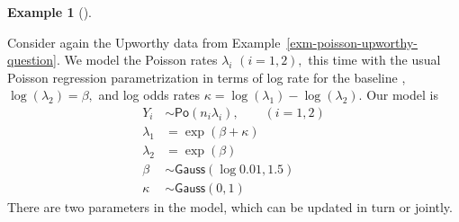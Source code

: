 \documentclass[
  11pt,
  letterpaper,
]{scrbook}
\theoremstyle{definition}
\newtheorem{example}{Example}[chapter]
\theoremstyle{plain}
\theoremstyle{plain}
\theoremstyle{plain}
\theoremstyle{definition}
\theoremstyle{definition}
\theoremstyle{plain}
\theoremstyle{plain}
\theoremstyle{remark}
\begin{document}
\begin{example}[]\protect\hypertarget{exm-upworthy-question}{}\label{exm-upworthy-question}

Consider again the Upworthy data from
Example~\ref{exm-poisson-upworthy-question}. We model the Poisson rates
\(\lambda_i\) \((i=1,2),\) this time with the usual Poisson regression
parametrization in terms of log rate for the baseline ,
\(\log(\lambda_2) = \beta,\) and log odds rates
\(\kappa = \log(\lambda_1) - \log(\lambda_2).\) Our model is
\begin{align*}
Y_{i} &\sim \mathsf{Po}(n_i\lambda_i), \qquad (i=1,2)\\
\lambda_1 &= \exp(\beta + \kappa) \\
\lambda_2 &= \exp(\beta) \\
\beta & \sim \mathsf{Gauss}(\log 0.01, 1.5) \\
\kappa &\sim \mathsf{Gauss}(0, 1)
\end{align*} There are two parameters in the model, which can be updated
in turn or jointly.


\end{example}
\end{document}
